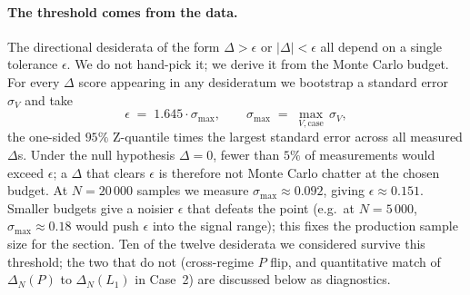\paragraph{The threshold comes from the data.}
The directional desiderata of the form $\Delta > \epsilon$ or $\lvert \Delta \rvert <
\epsilon$ all depend on a single tolerance $\epsilon$. We do not hand-pick it; we
derive it from the Monte Carlo budget. For every $\Delta$ score appearing in any
desideratum we bootstrap a standard error $\sigma_V$ and take
\[
\epsilon \;=\; 1.645 \cdot \sigma_{\max},
\qquad
\sigma_{\max} \;=\; \max_{V,\text{case}}\, \sigma_V,
\]
the one-sided $95\%$ Z-quantile times the largest standard error across all measured
$\Delta$s. Under the null hypothesis $\Delta = 0$, fewer than $5\%$ of measurements
would exceed $\epsilon$; a $\Delta$ that clears $\epsilon$ is therefore not Monte Carlo
chatter at the chosen budget. At $N = 20\,000$ samples we measure $\sigma_{\max} \approx
0.092$, giving $\epsilon \approx 0.151$. Smaller budgets give a noisier $\epsilon$ that
defeats the point (e.g.\ at $N = 5\,000$, $\sigma_{\max} \approx 0.18$ would push
$\epsilon$ into the signal range); this fixes the production sample size for the
section. Ten of the twelve desiderata we considered survive this
threshold; the two that do not (cross-regime $P$ flip, and quantitative match of
$\Delta_N(P)$ to $\Delta_N(L_1)$ in Case~2) are discussed below as diagnostics.


